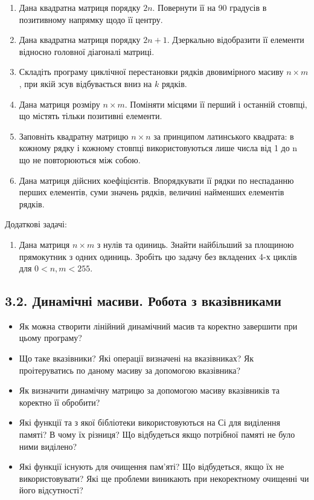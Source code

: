 \documentclass[]{article}
\makeatletter
\newcommand{\xslalph}[1]{\expandafter\@xslalph\csname c@#1\endcsname}
\newcommand{\@xslalph}[1]{%
    \ifcase#1\or а\or б\or в\or г\or д\or e\or є\or ж\or з\or i%
    \or й\or к\or л\or м\or н\or о\or п\or р\or с\or т%
    \or у\or ф\or х\or ц\or ч\or ш\or ю\or я\or аа\or бб\or вв%
    \else\@ctrerr\fi%
}
\makeatother
\begin{document}
\begin{enumerate}
\begin{enumerate}[label=\xslalph*)]
\begin{enumerate}
\begin{enumerate}[label=\xslalph*)]
\begin{enumerate}
\item
  Дана квадратна матриця порядку $2n$. Повернути її на 90 градусів в
  позитивному напрямку щодо її центру.
\item
  Дана квадратна матриця порядку $2n + 1$. Дзеркально відобразити її
  елементи відносно головної діагоналі матриці.
\item
  Складіть програму циклічної перестановки рядків двовимірного масиву $n \times m$,
  при якій зсув відбувається вниз на $k$ рядків.
\item
  Дана матриця розміру $n \times m$. Поміняти місцями її перший і останній
  стовпці, що містять тільки позитивні елементи.

\item
  Заповніть квадратну матрицю $n \times n$ за принципом латинського квадрата: в
  кожному рядку і кожному стовпці використовуються лише числа від 1 до n
  що не повторюються між собою.
\item
  Дана матриця дійсних коефіцієнтів. Впорядкувати її рядки по неспаданню
  перших елементів, суми значень рядків, величині найменших елементів
  рядків.
\end{enumerate}

Додаткові задачі:

\begin{enumerate}
\def\labelenumi{\arabic{enumi})}
\item
  Дана матриця $n \times m$ з нулів та одиниць. Знайти найбільший за площиною
  прямокутник з одних одиниць. Зробіть цю задачу без вкладених 4-х
  циклів для $0<n,m<255$.
\end{enumerate}

\newpage
\subsection{3.2. Динамічні масиви. Робота з вказівниками }
\setcounter{subsection}{1}


\begin{itemize}
\item
  Як можна створити лінійний динамічний масив та коректно завершити при
  цьому програму?
\item
  Що таке вказівники? Які операції визначені на вказівниках? Як
  проітеруватись по даному масиву за допомогою вказівника?
\item
  Як визначити динамічну матрицю за допомогою масиву вказівників та
  коректно її обробити?
\item
  Які функції та з якої бібліотеки використовуються на Сі для виділення
  памяті? В чому їх різниця? Що відбудеться якщо потрібної памяті не
  було ними виділено?
\item
  Які функції існують для очищення пам'яті? Що відбудеться, якщо їх не
  використовувати? Які ще проблеми виникають при некоректному очищенні
  чи його відсутності?
\end{itemize}


\end{enumerate}
\end{enumerate}
\end{enumerate}
\end{enumerate}
\end{document}
